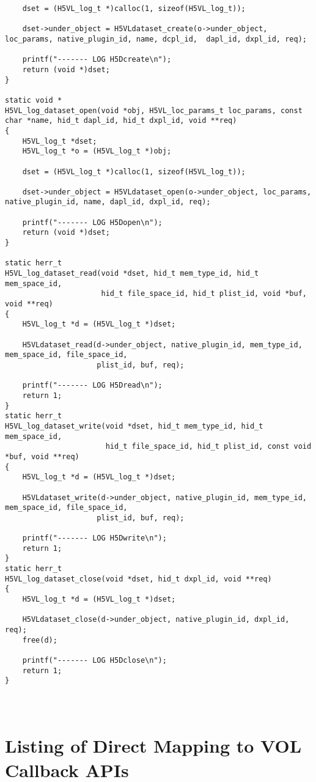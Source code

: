 \begin{appendices}
\begin{lstlisting}
    dset = (H5VL_log_t *)calloc(1, sizeof(H5VL_log_t));

    dset->under_object = H5VLdataset_create(o->under_object, loc_params, native_plugin_id, name, dcpl_id,  dapl_id, dxpl_id, req);

    printf("------- LOG H5Dcreate\n");
    return (void *)dset;
}

static void *
H5VL_log_dataset_open(void *obj, H5VL_loc_params_t loc_params, const char *name, hid_t dapl_id, hid_t dxpl_id, void **req)
{
    H5VL_log_t *dset;
    H5VL_log_t *o = (H5VL_log_t *)obj;

    dset = (H5VL_log_t *)calloc(1, sizeof(H5VL_log_t));

    dset->under_object = H5VLdataset_open(o->under_object, loc_params, native_plugin_id, name, dapl_id, dxpl_id, req);

    printf("------- LOG H5Dopen\n");
    return (void *)dset;
}

static herr_t 
H5VL_log_dataset_read(void *dset, hid_t mem_type_id, hid_t mem_space_id,
                      hid_t file_space_id, hid_t plist_id, void *buf, void **req)
{
    H5VL_log_t *d = (H5VL_log_t *)dset;

    H5VLdataset_read(d->under_object, native_plugin_id, mem_type_id, mem_space_id, file_space_id, 
                     plist_id, buf, req);

    printf("------- LOG H5Dread\n");
    return 1;
}
static herr_t 
H5VL_log_dataset_write(void *dset, hid_t mem_type_id, hid_t mem_space_id,
                       hid_t file_space_id, hid_t plist_id, const void *buf, void **req)
{
    H5VL_log_t *d = (H5VL_log_t *)dset;

    H5VLdataset_write(d->under_object, native_plugin_id, mem_type_id, mem_space_id, file_space_id, 
                     plist_id, buf, req);

    printf("------- LOG H5Dwrite\n");
    return 1;
}
static herr_t 
H5VL_log_dataset_close(void *dset, hid_t dxpl_id, void **req)
{
    H5VL_log_t *d = (H5VL_log_t *)dset;

    H5VLdataset_close(d->under_object, native_plugin_id, dxpl_id, req);
    free(d);

    printf("------- LOG H5Dclose\n");
    return 1;
}
\end{lstlisting}

\section{\\Listing of Direct Mapping to VOL Callback APIs}
\label{sec:B}



\end{appendices}
